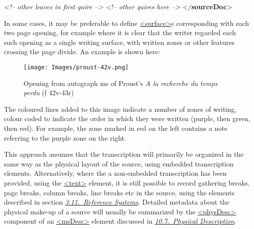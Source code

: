 \begin{shaded}
\hspace*{1em}\hspace*{1em}\mbox{}\newline 
\hspace*{1em}\mbox{}\newline 
\textit{<!-- other leaves in first quire -->}\mbox{}\newline 
{}\mbox{}\newline 
\textit{<!-- other quires here -->}\mbox{}\newline 
{</\textbf{sourceDoc}>}\end{shaded}\egroup\par \par
In some cases, it may be preferable to define \hyperref[TEI.surface]{<surface>}s corresponding with each two page opening, for example where it is clear that the writer regarded each such opening as a single writing surface, with written zones or other features crossing the page divide. An example is shown here: \begin{figure}[htbp]
\noindent\noindent\texttt{[image: Images/proust-42v.png]}
\caption{Opening from autograph ms of Proust's \textit{A la recherche du temps perdu} (f 42v-43r)}\end{figure}
\par
The coloured lines added to this image indicate a number of zones of writing, colour coded to indicate the order in which they were written (purple, then green, then red). For example, the zone marked in red on the left contains a note referring to the purple zone on the right. \par
This approach assumes that the transcription will primarily be organized in the same way as the physical layout of the source, using embedded transcription elements. Alternatively, where the a non-embedded transcription has been provided, using the \hyperref[TEI.text]{<text>} element, it is still possible to record gathering breaks, page breaks, column breaks, line breaks etc in the source, using the elements described in section \textit{\hyperref[CORS]{3.11.\ Reference Systems}}. Detailed metadata about the physical make-up of a source will usually be summarized by the \hyperref[TEI.physDesc]{<physDesc>} component of an \hyperref[TEI.msDesc]{<msDesc>} element discussed in \textit{\hyperref[msph]{10.7.\ Physical Description}}.
